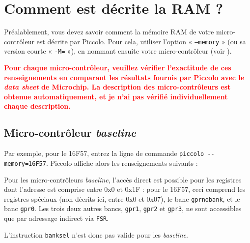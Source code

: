 
\cleardoublepage


\thispagestyle{empty}








\section{Comment est décrite la RAM ?}

Préalablement, vous devez savoir comment la mémoire RAM de votre micro-contrôleur est décrite par Piccolo. Pour cela, utiliser l'option « \texttt{--memory} » (ou sa version courte « \texttt{-M=} »), en nommant ensuite votre micro-contrôleur (voir ).

\textcolor{red}{\bf Pour chaque micro-contrôleur, veuillez vérifier l'exactitude de ces renseignements en comparant les résultats fournis par Piccolo avec le \emph{data sheet} de Microchip. La description des micro-contrôleurs est obtenue automatiquement, et je n'ai pas vérifié individuellement chaque description.}



\subsection{Micro-contrôleur \emph{baseline}}

Par exemple, pour le 16F57, entrez la ligne de commande \texttt{piccolo -{}-memory=16F57}. Piccolo affiche alors les renseignements suivants :

{\footnotesize }

Pour les micro-contrôleurs \emph{baseline}, l'accès direct est possible pour les registres dont l'adresse est comprise entre 0x0 et 0x1F : pour le 16F57, ceci comprend les registres spéciaux (non décrits ici, entre 0x0 et 0x07), le banc \texttt{gprnobank}, et le banc \texttt{gpr0}. Les trois deux autres bancs, \texttt{gpr1}, \texttt{gpr2} et \texttt{gpr3}, ne sont accessibles que par adressage indirect via \texttt{FSR}.

L'instruction \texttt{banksel} n'est donc pas valide pour les \emph{baseline}.

